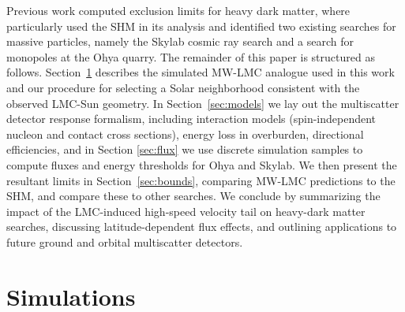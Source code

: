\documentclass[12pt]{article}
\begin{document}
Previous work \cite{Jacobs:2014yca,Bhoonah2021} computed exclusion limits for heavy dark matter, where \cite{Bhoonah2021} particularly used the SHM in its analysis and identified two existing searches for massive particles, namely the Skylab cosmic ray search and a search for monopoles at the Ohya quarry. The remainder of this paper is structured as follows. Section~\ref{sec:sims} describes the simulated MW-LMC analogue used in this work and our procedure for selecting a Solar neighborhood consistent with the observed LMC-Sun geometry. %
In Section~\ref{sec:models} we lay out the multiscatter detector response formalism, including interaction models (spin-independent nucleon and contact cross sections), energy loss in overburden, directional efficiencies, and in Section \ref{sec:flux} we use discrete simulation samples to compute fluxes and energy thresholds for Ohya and Skylab. We then present the resultant limits in Section~\ref{sec:bounds}, comparing MW-LMC predictions to the SHM, and compare these to other searches. We conclude by summarizing the impact of the LMC-induced high-speed velocity tail on heavy-dark matter searches, discussing latitude-dependent flux effects, and outlining applications to future ground and orbital multiscatter detectors.


%

\section{Simulations}
\label{sec:sims}

\end{document}
